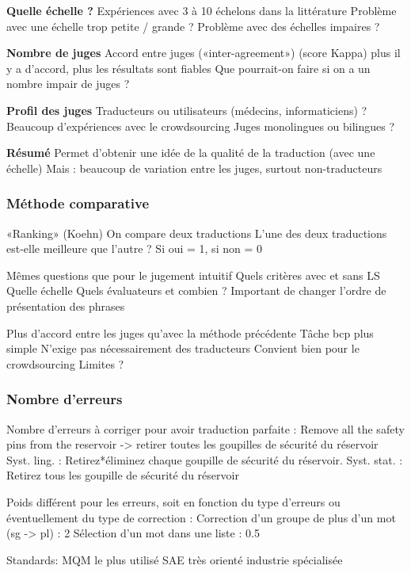 \textbf{Quelle échelle ?}
Expériences avec 3 à 10 échelons dans la littérature
Problème avec une échelle trop petite / grande ?
Problème avec des échelles impaires ?

\textbf{Nombre de juges}
Accord entre juges («inter-agreement») (score Kappa)
plus il y a d’accord, plus les résultats sont fiables
Que pourrait-on faire si on a un nombre impair de juges ?

\textbf{Profil des juges}
Traducteurs ou utilisateurs (médecins, informaticiens) ?
Beaucoup d’expériences avec le crowdsourcing
Juges monolingues ou bilingues ?

\textbf{Résumé}
Permet d’obtenir une idée de la qualité de la traduction (avec une échelle)
Mais : beaucoup de variation entre les juges, surtout non-traducteurs

\subsubsection{Méthode comparative}

«Ranking» (Koehn)
On compare deux traductions
L’une des deux traductions est-elle meilleure que l’autre ?
Si oui = 1, si non = 0

Mêmes questions que pour le jugement intuitif
Quels critères
avec et sans LS
Quelle échelle
Quels évaluateurs et combien ?
Important de changer l’ordre de présentation des phrases

Plus d’accord entre les juges qu’avec la méthode précédente
Tâche bcp plus simple
N’exige pas nécessairement des traducteurs
Convient bien pour le crowdsourcing
Limites ?

\subsubsection{Nombre d'erreurs}

Nombre d’erreurs à corriger pour avoir traduction parfaite :
Remove all the safety pins from the reservoir -> retirer toutes les goupilles de sécurité du réservoir
Syst. ling. : Retirez{*éliminez} chaque goupille de sécurité du réservoir.
Syst. stat. : Retirez tous les goupille de sécurité du réservoir

Poids différent pour les erreurs, soit en fonction du type d’erreurs ou éventuellement du type de correction :
Correction d’un groupe de plus d’un mot (sg -> pl) : 2
Sélection d’un mot dans une liste : 0.5

Standards:
    MQM le plus utilisé
    SAE très orienté industrie spécialisée

